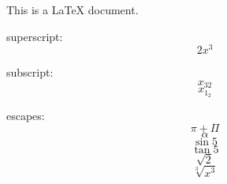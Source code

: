 \documentclass[11pt]{article}
\begin{document}
This is a LaTeX document.

superscript: $$2x^3$$

subscript: $$x_{32}$$
$$x_{1_2}$$

escapes:
$$\pi+\Pi$$
$$\alpha$$
$$\sin{5}$$
$$\tan{5}$$
$$\sqrt{2}$$
$$\sqrt[3]{x^3}$$
\end{document}
